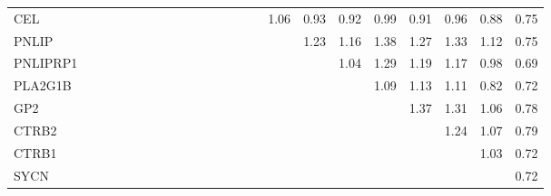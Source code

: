 \begin{longtable}{lrrrrrrrrrrrrrrrrrrrrrr}
CEL      &              &              &              &             &             &             &             &            &              &            &            &            &             &           &        1.06 &           0.93 &          0.92 &      0.99 &        0.91 &        0.96 &       0.88 &       0.75 \\
PNLIP    &              &              &              &             &             &             &             &            &              &            &            &            &             &           &             &           1.23 &          1.16 &      1.38 &        1.27 &        1.33 &       1.12 &       0.75 \\
PNLIPRP1 &              &              &              &             &             &             &             &            &              &            &            &            &             &           &             &                &          1.04 &      1.29 &        1.19 &        1.17 &       0.98 &       0.69 \\
PLA2G1B  &              &              &              &             &             &             &             &            &              &            &            &            &             &           &             &                &               &      1.09 &        1.13 &        1.11 &       0.82 &       0.72 \\
GP2      &              &              &              &             &             &             &             &            &              &            &            &            &             &           &             &                &               &           &        1.37 &        1.31 &       1.06 &       0.78 \\
CTRB2    &              &              &              &             &             &             &             &            &              &            &            &            &             &           &             &                &               &           &             &        1.24 &       1.07 &       0.79 \\
CTRB1    &              &              &              &             &             &             &             &            &              &            &            &            &             &           &             &                &               &           &             &             &       1.03 &       0.72 \\
SYCN     &              &              &              &             &             &             &             &            &              &            &            &            &             &           &             &                &               &           &             &             &            &       0.72 \\
\end{longtable}


